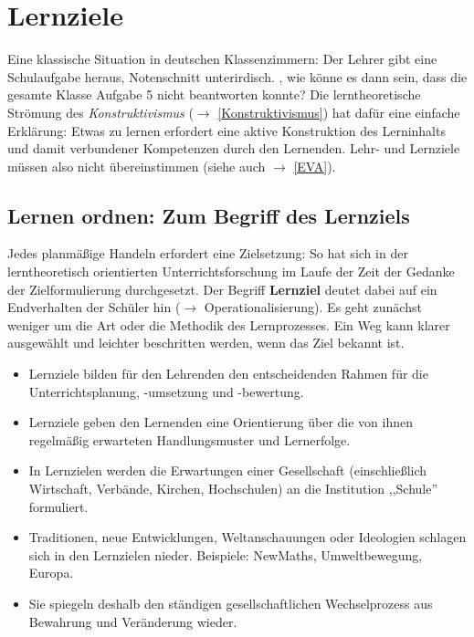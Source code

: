 \chapter{Lernziele}\label{Lernziel}\label{Ziele}

Eine klassische Situation in deutschen Klassenzimmern: Der Lehrer gibt eine Schulaufgabe heraus, Notenschnitt unterirdisch. , wie könne es dann sein, dass die gesamte Klasse Aufgabe 5 nicht beantworten konnte? Die lerntheoretische Strömung des \emph{Konstruktivismus} ($\to$ \cref{Konstruktivismus}) hat dafür eine einfache Erklärung: Etwas zu lernen erfordert eine aktive Konstruktion des Lerninhalts und damit verbundener Kompetenzen durch den Lernenden. Lehr- und Lernziele müssen also nicht übereinstimmen (siehe auch $\to$ \cref{EVA}).

\section{Lernen ordnen: Zum Begriff des Lernziels}
Jedes planm\"{a}{\ss}ige Handeln erfordert eine Zielsetzung:
So hat sich in der lerntheoretisch orientierten Unterrichtsforschung im Laufe der Zeit der Gedanke
der Zielformulierung durchgesetzt.
\mip
Der Begriff {\bf Lernziel} deutet dabei auf ein Endverhalten
der Sch\"{u}ler hin ($\to$ Operationalisierung). Es geht zun\"{a}chst weniger um die Art oder die Methodik
des Lernprozesses.
\mip
Ein Weg kann klarer ausgew\"{a}hlt und leichter beschritten werden,
wenn das Ziel bekannt ist.

\begin{itemize}
	\item Lernziele bilden f\"{u}r den Lehrenden den entscheidenden Rahmen f\"{u}r die
	Unterrichtsplanung, -umsetzung und -bewertung.
	\item Lernziele geben den Lernenden eine Orientierung über die von ihnen regelmäßig erwarteten Handlungsmuster und Lernerfolge.
	\item In Lernzielen werden die Erwartungen einer Gesellschaft
	(einschlie{\ss}lich Wirtschaft, Verb\"{a}nde, Kirchen, Hochschulen) an
	die Institution ,,Schule'' formuliert.
	\item Traditionen, neue Entwicklungen, Weltanschauungen oder
	Ideologien schlagen sich in den Lernzielen nieder.
	Beispiele: NewMaths, Umweltbewegung, Europa.
	\item
	Sie spiegeln deshalb den st\"{a}ndigen gesellschaftlichen
	Wechselprozess aus Bewahrung und Ver\"{a}nderung wieder.
%	
\end{itemize}

